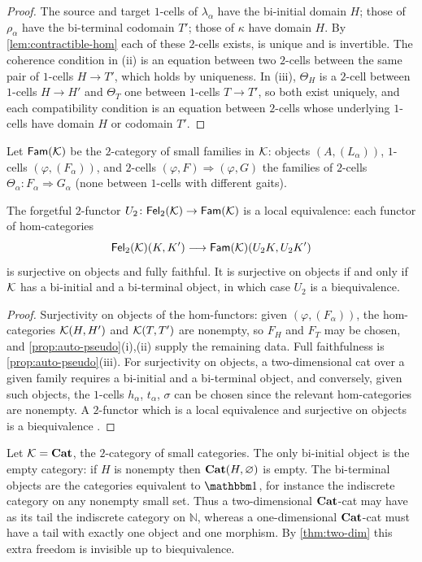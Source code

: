 \begin{proof}
The source and target $1$-cells of $\lambda_\alpha$ have the bi-initial domain
$H$; those of $\rho_\alpha$ have the bi-terminal codomain $T'$; those of $\kappa$
have domain $H$. By \cref{lem:contractible-hom} each of these $2$-cells exists,
is unique and is invertible. The coherence condition in (ii) is an equation
between two $2$-cells between the same pair of $1$-cells $H\to T'$, which holds
by uniqueness. In (iii), $\Theta_H$ is a $2$-cell between $1$-cells $H\to H'$
and $\Theta_T$ one between $1$-cells $T\to T'$, so both exist uniquely, and each
compatibility condition is an equation between $2$-cells whose underlying
$1$-cells have domain $H$ or codomain $T'$.
\end{proof}

Let $\mathsf{Fam}(\mathcal{K})$ be the $2$-category of small families in $\mathcal{K}$: objects
$(A,(L_\alpha))$, $1$-cells $(\varphi,(F_\alpha))$, and $2$-cells
$(\varphi,F)\Rightarrow(\varphi,G)$ the families of $2$-cells
$\Theta_\alpha\colon F_\alpha\Rightarrow G_\alpha$ (none between $1$-cells with
different gaits).

\begin{theorem}\label{thm:two-dim}
The forgetful $2$-functor $U_2\colon\mathsf{Fel}_2(\mathcal{K})\to\mathsf{Fam}(\mathcal{K})$ is a local
equivalence: each functor of hom-categories
\[
\mathsf{Fel}_2(\mathcal{K})(K,K')\longrightarrow\mathsf{Fam}(\mathcal{K})(U_2K,U_2K')
\]
is surjective on objects and fully faithful. It is surjective on objects if and only if $\mathcal{K}$ has a bi-initial and
a bi-terminal object, in which case $U_2$ is a biequivalence.
\end{theorem}

\begin{proof}
Surjectivity on objects of the hom-functors: given $(\varphi,(F_\alpha))$, the
hom-categories $\mathcal{K}(H,H')$ and $\mathcal{K}(T,T')$ are nonempty, so $F_H$ and $F_T$
may be chosen, and \cref{prop:auto-pseudo}(i),(ii) supply the remaining data.
Full faithfulness is \cref{prop:auto-pseudo}(iii). For surjectivity on
objects, a two-dimensional cat over a given family requires a bi-initial and a
bi-terminal object, and conversely, given such objects, the $1$-cells
$h_\alpha$, $t_\alpha$, $\sigma$ can be chosen since the relevant hom-categories
are nonempty. A $2$-functor which is a local equivalence and surjective on
objects is a biequivalence \cite{JohnsonYau2021}.
\end{proof}

\begin{example}\label{ex:two-dim-cat}
Let $\mathcal{K}=\mathbf{Cat}$, the $2$-category of small categories. The only bi-initial
object is the empty category: if $H$ is nonempty then $\mathbf{Cat}(H,\varnothing)$ is
empty. The bi-terminal objects are the categories equivalent to $\one$, for
instance the indiscrete category on any nonempty small set. Thus a
two-dimensional $\mathbf{Cat}$-cat may have as its tail the indiscrete category on
$\mathbb N$, whereas a one-dimensional $\mathbf{Cat}$-cat must have a tail with exactly
one object and one morphism. By \cref{thm:two-dim} this extra freedom is
invisible up to biequivalence.
\end{example}

